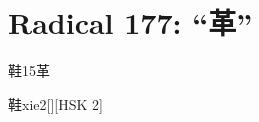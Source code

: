 
\section*{Radical 177: ``⾰''}

\begin{entry}{鞋}{15}{⾰}
  \begin{phonetics}{鞋}{xie2}[][HSK 2]
  \end{phonetics}
\end{entry}


